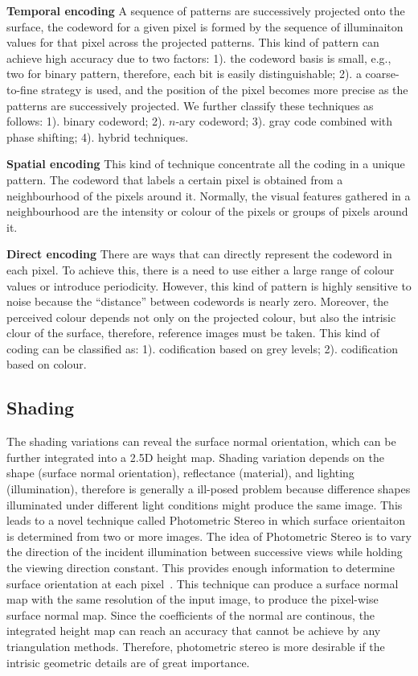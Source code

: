 \textbf{Temporal encoding} A sequence of patterns are successively projected onto the surface, the codeword for a given pixel is formed by the sequence of illuminaiton values for that pixel across the projected patterns. This kind of pattern can achieve high accuracy due to two factors: 1). the codeword basis is small, e.g., two for binary pattern, therefore, each bit is easily distinguishable; 2). a coarse-to-fine strategy is used, and the position of the pixel becomes more precise as the patterns are successively projected. We further classify these techniques as follows: 1). binary codeword; 2). $n$-ary codeword; 3). gray code combined with phase shifting; 4). hybrid techniques.

\textbf{Spatial encoding} This kind of technique concentrate all the coding in a unique pattern. The codeword that labels a certain pixel is obtained from a neighbourhood of the pixels around it. Normally, the visual features gathered in a neighbourhood are the intensity or colour of the pixels or groups of pixels around it.

\textbf{Direct encoding} There are ways that can directly represent the codeword in each pixel. To achieve this, there is a need to use either a large range of colour values or introduce periodicity. However, this kind of pattern is highly sensitive to noise because the ``distance'' between codewords is nearly zero. Moreover, the perceived colour depends not only on the projected colour, but also the intrisic clour of the surface, therefore, reference images must be taken. This kind of coding can be classified as: 1). codification based on grey levels; 2). codification based on colour.

\subsection{Shading}
The shading variations can reveal the surface normal orientation, which can be further integrated into a 2.5D height map. Shading variation depends on the shape (surface normal orientation), reflectance (material), and lighting (illumination), therefore is generally a ill-posed problem because difference shapes illuminated under different light conditions might produce the same image. This leads to a novel technique called Photometric Stereo in which surface orientaiton is determined from two or more images. The idea of Photometric Stereo is to vary the direction of the incident illumination between successive views while holding the viewing direction constant. This provides enough information to determine surface orientation at each pixel~\cite{woodham1979photometric}. This technique can produce a surface normal map with the same resolution of the input image, \ie to produce the pixel-wise surface normal map. Since the coefficients of the normal are continous, the integrated height map can reach an accuracy that cannot be achieve by any triangulation methods. Therefore, photometric stereo is more desirable if the intrisic geometric details are of great importance.

